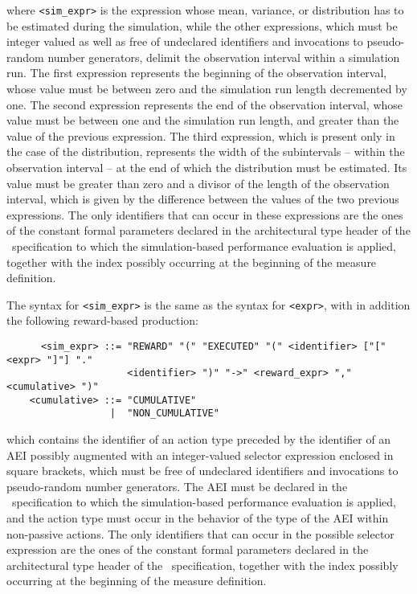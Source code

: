 \noindent where {\tt <sim\_expr>} is the expression whose mean, variance, or distribution has to be
estimated during the simulation, while the other expressions, which must be integer valued as well as free
of undeclared identifiers and invocations to pseudo-random number generators, delimit the observation
interval within a simulation run. The first expression represents the beginning of the observation interval,
whose value must be between zero and the simulation run length decremented by one. The second expression
represents the end of the observation interval, whose value must be between one and the simulation run
length, and greater than the value of the previous expression. The third expression, which is present only
in the case of the distribution, represents the width of the subintervals -- within the observation interval
-- at the end of which the distribution must be estimated. Its value must be greater than zero and a divisor
of the length of the observation interval, which is given by the difference between the values of the two
previous expressions. The only identifiers that can occur in these expressions are the ones of the constant
formal parameters declared in the architectural type header of the \aemilia\ specification to which the
simulation-based performance evaluation is applied, together with the index possibly occurring at the
beginning of the measure definition.

The syntax for {\tt <sim\_expr>} is the same as the syntax for {\tt <expr>}, with in addition the following
reward-based production:

        \begin{verbatim}
      <sim_expr> ::= "REWARD" "(" "EXECUTED" "(" <identifier> ["[" <expr> "]"] "."
                     <identifier> ")" "->" <reward_expr> "," <cumulative> ")"
    <cumulative> ::= "CUMULATIVE"
                  |  "NON_CUMULATIVE"
        \end{verbatim}

\noindent which contains the identifier of an action type preceded by the identifier of an AEI possibly
augmented with an integer-valued selector expression enclosed in square brackets, which must be free of
undeclared identifiers and invocations to pseudo-random number generators. The AEI must be declared in the
\aemilia\ specification to which the simulation-based performance evaluation is applied, and the action type
must occur in the behavior of the type of the AEI within non-passive actions. The only identifiers that can
occur in the possible selector expression are the ones of the constant formal parameters declared in the
architectural type header of the \aemilia\ specification, together with the index possibly occurring at the
beginning of the measure definition.

